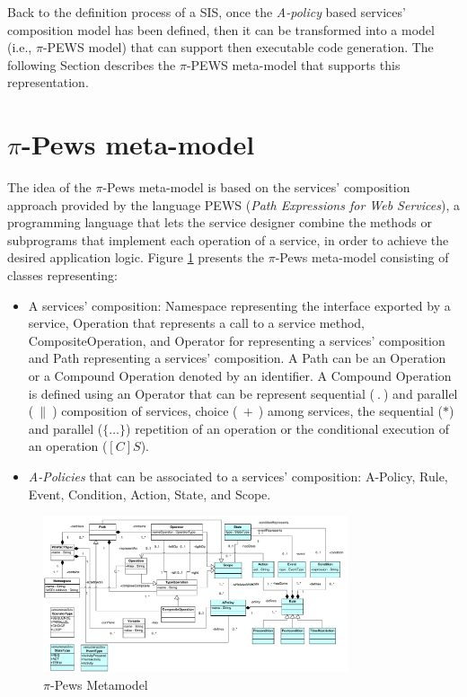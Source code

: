 Back to the  definition process of a SIS, once the {\em A-policy} based services' composition model has been defined, then it can be transformed into a model (i.e., $\pi$-PEWS model) that can support then executable code generation. The following Section describes the $\pi$-PEWS  meta-model that supports this representation. 


\section{$\pi$-{\sc Pews}  meta-model}\label{sec:pewsmetamodel}
The idea of the $\pi$-{\sc Pews} meta-model is based on the services' composition approach provided by the language PEWS\cite{BaAM06,Placido2010LTPD} (\textit{Path Expressions for Web Services}), a programming language that lets the service designer  combine the methods or subprograms that
implement each operation of a service, in order to achieve the desired application logic. Figure \ref{fig:metamodel} presents the $\pi$-{\sc Pews} meta-model
consisting of  classes representing:
\begin{itemize}
\item A services' composition: {\sc Namespace} representing the interface exported by a service, {\sc Operation} that represents a call to a service method, {\sc CompositeOperation}, and  {\sc Operator} for representing a services' composition and {\sc Path} representing a services' composition.
A {\sc Path} can be an {\sc Operation} or a {\sc Compound Operation}
denoted by an identifier. A {\sc Compound Operation} is defined using an  {\sc Operator}  that can be represent  sequential ($\ . \ $) and parallel ($\ \| \ $) composition of services,
 choice ($\ + \ $) among services,
the sequential ($*$) and parallel ($\{\dots\}$) repetition of an operation or the conditional execution of an operation ($[C]S$).

\item {\em A-Policies} that can be associated to a services' composition:  {\sc A-Policy}, {\sc Rule}, {\sc Event}, {\sc Condition}, {\sc Action}, {\sc State}, and {\sc Scope}.
\end{itemize}
%
\begin{figure}
\centering
\includegraphics[width=0.80\textwidth]{figs/PEWSMetamodel}
\caption{$\pi$-{\sc Pews} Metamodel}
\label{fig:metamodel}
\end{figure}


